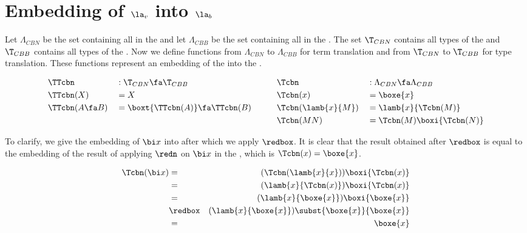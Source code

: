 \section{\texorpdfstring{Embedding of \boldmath${\la_v}$ into \boldmath${\la_b}$}{Embedding of call-by-value lambda calculus into the call-by-box lambda calculus}}


Let $\Lambda_{CBN}$ be the set containing all \lterms in the \lan
and let $\Lambda_{CBB}$ be the set containing all \lterms in the \lab. 
The set $\T_{CBN}$ contains all types of the \lan and $\T_{CBB}$ contains all types of the \lab. 
Now we define functions from $\Lambda_{CBN}$ to $\Lambda_{CBB}$ for term translation and from $\T_{CBN}$ to $\T_{CBB}$ for type translation. 
These functions represent an embedding of the \lan into the \lab. 

\[
\begin{aligned}
  & \TTcbn          & & : \T_{CBN} \fa \T_{CBB}           & & \quad & & \Tcbn              & &: \Lambda_{CBN} \fa \Lambda_{CBB} \\
  & \TTcbn(X)       & & = X                               & & \quad & & \Tcbn(x)           & &= \boxe{x} \\
  & \TTcbn(A \fa B) & & = \boxt{\TTcbn(A)} \fa \TTcbn(B)  & & \quad & & \Tcbn(\lamb{x}{M}) & &= \lamb{x}{\Tcbn(M)} \\
  &                 & &                                   & & \quad & & \Tcbn(M N)         & &= \Tcbn(M) \boxi{\Tcbn(N)}
\end{aligned}
\]

To clarify, we give the embedding of $\bi x$ into \lab after which we apply $\redbox$. 
It is clear that the result obtained after $\redbox$ is equal to the embedding of the result of applying $\redn$ on $\bi x$ in the \lan, which is $\Tcbn(x) = \boxe{x}$.  

\begin{eqnarray*}
  \Tcbn(\bi x) &=& (\Tcbn(\lamb{x}{x})) \boxi{\Tcbn(x)} \\
  &=& (\lamb{x}{\Tcbn(x)}) \boxi{\Tcbn(x)} \\
  &=& (\lamb{x}{\boxe{x}}) \boxi{\boxe{x}} \\
  &\redbox& (\lamb{x}{\boxe{x}}) \subst{\boxe{x}}{\boxe{x}} \\
  &=& \boxe{x}
\end{eqnarray*}
